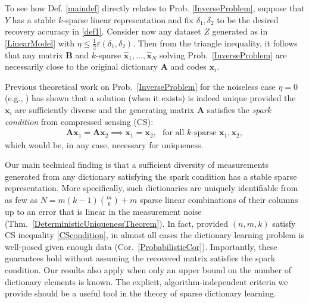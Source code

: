 \documentclass[9pt,twocolumn]{pnas-new}
\begin{document}
To see how Def. \ref{maindef} directly relates to Prob. \ref{InverseProblem}, suppose that $Y$
has a stable $k$-sparse linear representation and fix $\delta_1, \delta_2$ to be the desired recovery accuracy in \eqref{def1}. Consider now any dataset $Z$ generated as in \eqref{LinearModel} with $\eta \leq \frac{1}{2} \varepsilon(\delta_1, \delta_2)$. Then from the triangle inequality, it follows that any matrix $\mathbf{B}$ and $k$-sparse $\mathbf{\hat x}_1, \ldots, \mathbf{\hat x}_N$ solving Prob.~\ref{InverseProblem} are necessarily close to the original dictionary $\mathbf{A}$ and codes $\mathbf{x}_i$. 




Previous theoretical work on Prob.~\ref{InverseProblem} for the noiseless case $\eta =0$ (e.g., \cite{li2004analysis, Georgiev05, Aharon06, Hillar15}) has shown that a solution (when it exists) is indeed unique provided the $\mathbf{x}_i$ are sufficiently diverse and the generating matrix $\mathbf{A}$ satisfies the \textit{spark condition} from compressed sensing (CS):
\begin{align}\label{SparkCondition}
\mathbf{A}\mathbf{x}_1 = \mathbf{A}\mathbf{x}_2 \implies \mathbf{x}_1 = \mathbf{x}_2, \ \ \ \text{for all $k$-sparse } \mathbf{x}_1, \mathbf{x}_2,
\end{align}
%
which would be, in any case, necessary for uniqueness.

Our main technical finding is that a sufficient diversity of measurements generated from any dictionary satisfying the spark condition 
has a stable sparse representation.  More specifically, such dictionaries are uniquely identifiable from as few as \mbox{$N = m(k-1){m \choose k} + m$} sparse linear combinations of their columns up to an error that is linear in the measurement noise (Thm.~\ref{DeterministicUniquenessTheorem}). In fact, provided $(n, m, k)$ satisfy CS inequality \eqref{CScondition}, in almost all cases the dictionary learning problem is well-posed given enough data (Cor.~\ref{ProbabilisticCor}). Importantly, these guarantees hold without assuming the recovered matrix satisfies the spark condition. Our results  also apply when only an upper bound on the number of dictionary elements is known. The explicit, algorithm-independent criteria we provide should be a useful tool in the theory of sparse dictionary learning.  %
\end{document}
